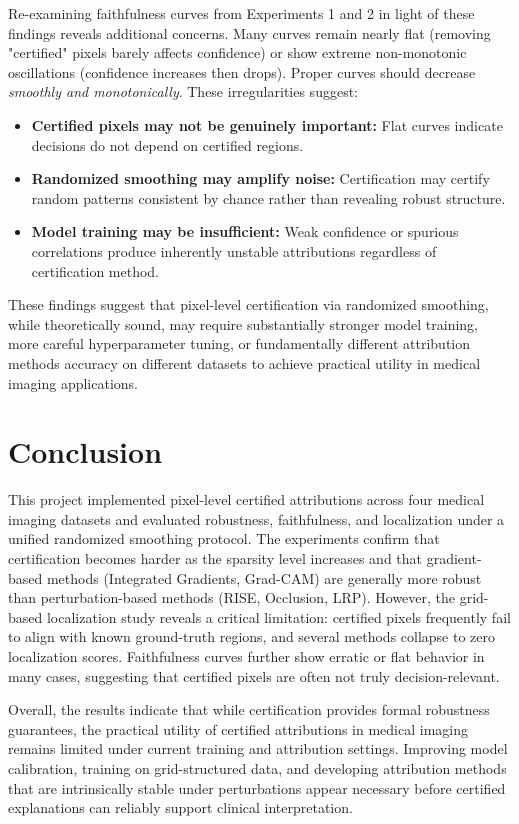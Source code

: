 \documentclass[11pt]{article}
\begin{document}
Re-examining faithfulness curves from Experiments 1 and 2 in light of these findings reveals additional concerns. Many curves remain nearly flat (removing "certified" pixels barely affects confidence) or show extreme non-monotonic oscillations (confidence increases then drops). Proper curves should decrease \emph{smoothly and monotonically}. These irregularities suggest:

\begin{itemize}
\item \textbf{Certified pixels may not be genuinely important:} Flat curves indicate decisions do not depend on certified regions.
\item \textbf{Randomized smoothing may amplify noise:} Certification may certify random patterns consistent by chance rather than revealing robust structure.
\item \textbf{Model training may be insufficient:} Weak confidence or spurious correlations produce inherently unstable attributions regardless of certification method.
\end{itemize}

These findings suggest that pixel-level certification via randomized smoothing, while theoretically sound, may require substantially stronger model training, more careful hyperparameter tuning, or fundamentally different attribution methods accuracy on different datasets to achieve practical utility in medical imaging applications.


\section{Conclusion}
This project implemented pixel-level certified attributions across four medical imaging datasets and evaluated robustness, faithfulness, and localization under a unified randomized smoothing protocol. The experiments confirm that certification becomes harder as the sparsity level increases and that gradient-based methods (Integrated Gradients, Grad-CAM) are generally more robust than perturbation-based methods (RISE, Occlusion, LRP). However, the grid-based localization study reveals a critical limitation: certified pixels frequently fail to align with known ground-truth regions, and several methods collapse to zero localization scores. Faithfulness curves further show erratic or flat behavior in many cases, suggesting that certified pixels are often not truly decision-relevant.

Overall, the results indicate that while certification provides formal robustness guarantees, the practical utility of certified attributions in medical imaging remains limited under current training and attribution settings. Improving model calibration, training on grid-structured data, and developing attribution methods that are intrinsically stable under perturbations appear necessary before certified explanations can reliably support clinical interpretation.


\end{document}
